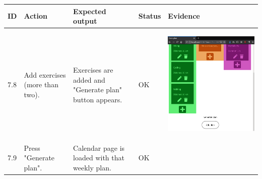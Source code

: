 \documentclass[12pt,twoside,titlepage,a4paper]{article}
\theoremstyle{definicion}
\theoremstyle{lema}
\theoremstyle{teorema}
\theoremstyle{corolario}
\theoremstyle{ejemplo}
\theoremstyle{nota}
\begin{document}
\begin{table}[!h]
	\centering
	\begin{tabular}{|m{0.6cm}|m{2.9cm}|m{3.6cm}|m{1.1cm}|m{5.9cm}|}
		\hline
		\textbf{ID} & \textbf{Action} & \textbf{Expected output} & \textbf{Status} & \textbf{Evidence} \\ 
		\hline
		7.8 & Add exercises (more than two). & Exercises are added and "Generate plan" button appears. & OK &
		\begin{center}\includegraphics[scale=0.18]{newplan4.png}\end{center} \\
		\hline
		7.9 & Press "Generate plan". & Calendar page is loaded with that weekly plan. & OK &

\end{tabular}
\end{table}
\end{document}
